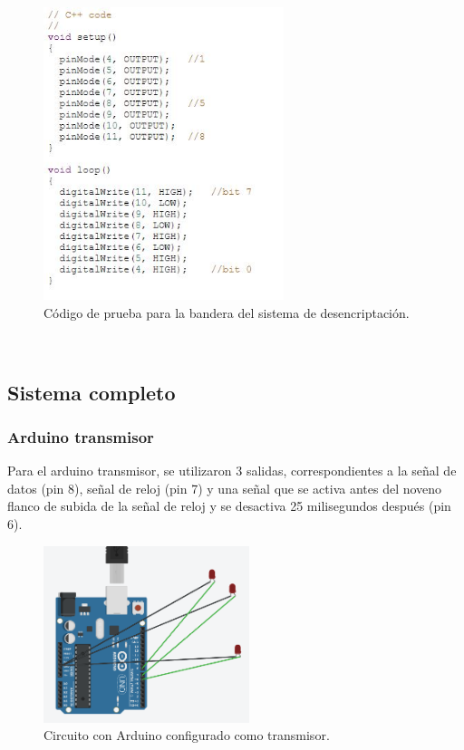 \documentclass{article}
\begin{document}
\begin{figure}[h]
\includegraphics[width=7cm]{Desencrip1.JPG}
\centering
\caption{Código de prueba para la bandera del sistema de desencriptación.}
\label{fig:Desencrip1.PNG}
\end{figure}
\cite{punto3}\\

\newpage


\subsection{Sistema completo}

\subsubsection{Arduino transmisor}

Para el arduino transmisor, se utilizaron 3 salidas, correspondientes a la señal de datos (pin 8), señal de reloj (pin 7) y una señal que se activa antes del noveno flanco de subida de la señal de reloj y se desactiva 25 milisegundos después (pin 6).\\

\newpage

\begin{figure}[h]
\includegraphics[width=6cm]{arduino_transmisor.PNG}
\centering
\caption{Circuito con Arduino configurado como transmisor.}
\label{fig:arduino_transmisor.PNG}
\end{figure}
\cite{punto41}\\
\end{document}
